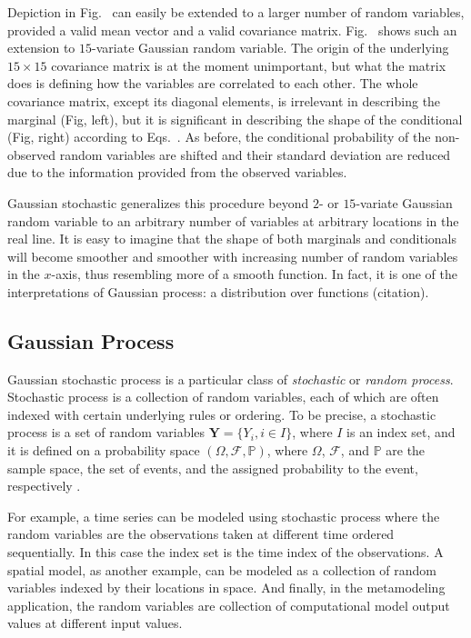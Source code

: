Depiction in Fig.~ can easily be extended to a larger number of random variables, provided a valid mean vector and a valid covariance matrix.
Fig.~ shows such an extension to $15$-variate Gaussian random variable.
The origin of the underlying $15 \times 15$ covariance matrix is at the moment unimportant, but what the matrix does is defining how the variables are correlated to each other.
The whole covariance matrix, except its diagonal elements, is irrelevant in describing the marginal (Fig, left),
but it is significant in describing the shape of the conditional (Fig, right) according to Eqs.~.
As before, the conditional probability of the non-observed random variables are shifted and their standard deviation are reduced due to the information provided from the observed variables.

Gaussian stochastic generalizes this procedure beyond $2$- or $15$-variate Gaussian random variable to an arbitrary number of variables at arbitrary locations in the real line.
It is easy to imagine that the shape of both marginals and conditionals will become smoother and smoother with increasing number of random variables in the $x$-axis, thus resembling more of a smooth function.
In fact, it is one of the interpretations of Gaussian process: a distribution over functions (citation). 

\subsection{Gaussian Process}

Gaussian stochastic process is a particular class of \emph{stochastic} or \emph{random process}.
Stochastic process is a collection of random variables, each of which are often indexed with certain underlying rules or ordering.
To be precise, a stochastic process is a set of random variables $\mathbf{Y} = \{Y_i, i \in I\}$, where $I$ is an index set, 
and it is defined on a probability space $(\Omega, \mathcal{F}, \mathbb{P})$, 
where $\Omega$, $\mathcal{F}$, and $\mathbb{P}$ are the sample space, the set of events, and the assigned probability to the event, respectively \cite{Syski2014}.

For example, a time series can be modeled using stochastic process where the random variables are the observations taken at different time ordered sequentially.
In this case the index set is the time index of the observations.
A spatial model, as another example, can be modeled as a collection of random variables indexed by their locations in space.
And finally, in the metamodeling application, the random variables are collection of computational model output values at different input values.

